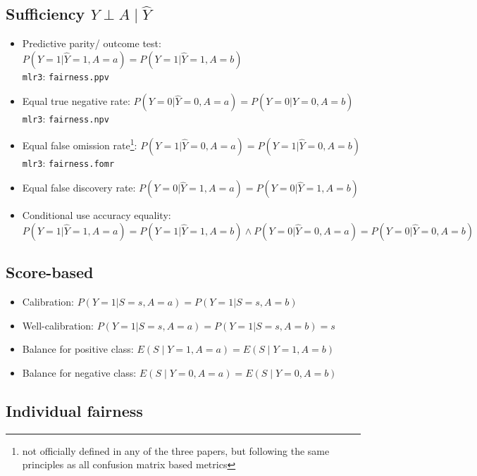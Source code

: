\documentclass[11pt,a4paper]{article}
\begin{document}
\subsection*{Sufficiency $Y \perp A \mid \hat{Y}$}
\begin{itemize}[leftmargin=2em]
    \item Predictive parity/ outcome test: $P(Y = 1 | \hat{Y} = 1, A = a) = P(Y = 1 | \hat{Y} = 1, A = b)$ \\ \texttt{mlr3}: \texttt{fairness.ppv}
    \item Equal true negative rate: $P(Y = 0 | \hat{Y} = 0, A = a) = P(Y = 0 | \hat{Y} = 0, A = b)$ \\ \texttt{mlr3}: \texttt{fairness.npv}
    \item Equal false omission rate\footnote{not officially defined in any of the three papers, but following the same principles as all confusion matrix based metrics}\label{fn:confusion_metrics}: $P(Y = 1 | \hat{Y} = 0, A = a) = P(Y = 1 | \hat{Y} = 0, A = b)$ \\ \texttt{mlr3}: \texttt{fairness.fomr}
    \item Equal false discovery rate: $P(Y = 0 | \hat{Y} = 1, A = a) = P(Y = 0 | \hat{Y} = 1, A = b)$ 
    \item Conditional use accuracy equality: $P(Y = 1 | \hat{Y} = 1, A = a) = P(Y = 1 | \hat{Y} = 1, A = b) \land P(Y = 0 | \hat{Y} = 0, A = a) = P(Y = 0 | \hat{Y} = 0, A = b)$
\end{itemize}

\subsection*{Score-based}
\begin{itemize}
    \item Calibration: $P(Y = 1 | S = s, A = a) = P(Y = 1 | S = s, A = b)$
    \item Well-calibration: $P(Y = 1 | S = s, A = a) = P(Y = 1 | S = s, A = b) = s$
    \item Balance for positive class: $E(S \mid Y = 1, A = a) = E(S \mid Y = 1, A = b)$
    \item Balance for negative class: $E(S \mid Y = 0, A = a) = E(S \mid Y = 0, A = b)$
\end{itemize}

\subsection*{Individual fairness}
\end{document}
